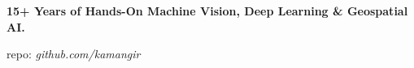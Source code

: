 \onehalfspace
\textbf{\large 15+ Years of Hands-On Machine Vision, Deep Learning \& Geospatial AI.}
\singlespace

\vspace{0.8cm}

repo: \emph{github.com/kamangir}
